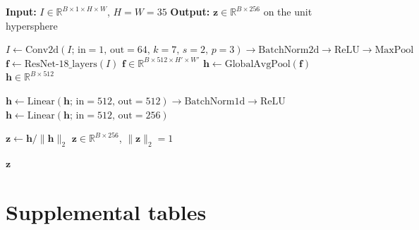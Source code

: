 \begin{algorithm}[H]
\caption{\textsc{Forward function of the ResNet-18 embedding model}}
\label{alg:resnet}
\begin{algorithmic}
\State \textbf{Input:} $I \in \mathbb{R}^{B \times 1 \times H \times W}$, $H = W = 35$
\State \textbf{Output:} $\mathbf{z} \in \mathbb{R}^{B \times 256}$ on the unit hypersphere

\State {}
\State $I \gets \mathrm{Conv2d}(I;\, \text{in}=1,\, \text{out}=64,\, k=7,\, s=2,\, p=3) \to \mathrm{BatchNorm2d} \to \mathrm{ReLU} \to \mathrm{MaxPool}$
\State $\mathbf{f} \gets \mathrm{ResNet\text{-}18\_layers}(I)$ \hfill $\mathbf{f} \in \mathbb{R}^{B \times 512 \times H' \times W'}$
\State $\mathbf{h} \gets \mathrm{GlobalAvgPool}(\mathbf{f})$ \hfill $\mathbf{h} \in \mathbb{R}^{B \times 512}$

\State {}
\State $\mathbf{h} \gets \mathrm{Linear}(\mathbf{h};\, \text{in}=512,\, \text{out}=512) \to \mathrm{BatchNorm1d} \to \mathrm{ReLU}$
\State $\mathbf{h} \gets \mathrm{Linear}(\mathbf{h};\, \text{in}=512,\, \text{out}=256)$

\State {}
\State $\mathbf{z} \gets \mathbf{h} / \|\mathbf{h}\|_2$ \hfill $\mathbf{z} \in \mathbb{R}^{B \times 256}$, $\|\mathbf{z}\|_2 = 1$

\State \Return $\mathbf{z}$
\end{algorithmic}
\end{algorithm}

\section{Supplemental tables}

